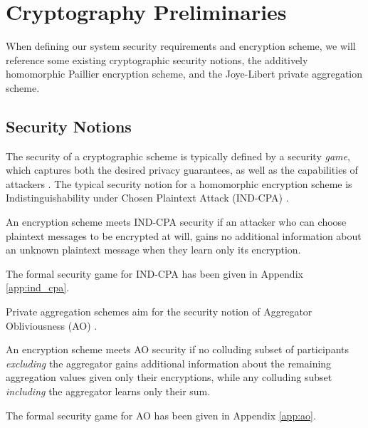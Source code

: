 \documentclass[twocolumn]{autart}
\begin{document}
\section{Cryptography Preliminaries} \label{sec:crypto_prelim}
When defining our system security requirements and encryption scheme, we will reference some existing cryptographic security notions, the additively homomorphic Paillier encryption scheme, and the Joye-Libert private aggregation scheme.

% 
% 

\subsection{Security Notions}
The security of a cryptographic scheme is typically defined by a security \textit{game}, which captures both the desired privacy guarantees, as well as the capabilities of attackers \cite{katzIntroductionModernCryptography2008}. The typical security notion for a homomorphic encryption scheme is Indistinguishability under Chosen Plaintext Attack (IND-CPA) \cite{chaseSecurityHomomorphicEncryption2017}. 
\begin{defn}
An encryption scheme meets IND-CPA security if an attacker who can choose plaintext messages to be encrypted at will, gains no additional information about an unknown plaintext message when they learn only its encryption. 

The formal security game for IND-CPA has been given in Appendix \ref{app:ind_cpa}.
\end{defn}
Private aggregation schemes aim for the security notion of Aggregator Obliviousness (AO) \cite{shiPrivacyPreservingAggregationTimeSeries2011}. 
\begin{defn}
An encryption scheme meets AO security if no colluding subset of participants \textit{excluding} the aggregator gains additional information about the remaining aggregation values given only their encryptions, while any colluding subset \textit{including} the aggregator learns only their sum. 

The formal security game for AO has been given in Appendix \ref{app:ao}.
\end{defn}
\end{document}
